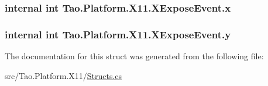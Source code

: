 \label{struct_tao_1_1_platform_1_1_x11_1_1_x_expose_event_a3272e69253de6126d1435b738e9318b5}
\hypertarget{struct_tao_1_1_platform_1_1_x11_1_1_x_expose_event_a4d2698124160d8bf10eee02399e1c3ca}{
\subsubsection[{x}]{\setlength{\rightskip}{0pt plus 5cm}internal int {\bf Tao.Platform.X11.XExposeEvent.x}}}
\label{struct_tao_1_1_platform_1_1_x11_1_1_x_expose_event_a4d2698124160d8bf10eee02399e1c3ca}
\hypertarget{struct_tao_1_1_platform_1_1_x11_1_1_x_expose_event_a47b92e32b09eca580a826f874be52e3c}{
\subsubsection[{y}]{\setlength{\rightskip}{0pt plus 5cm}internal int {\bf Tao.Platform.X11.XExposeEvent.y}}}
\label{struct_tao_1_1_platform_1_1_x11_1_1_x_expose_event_a47b92e32b09eca580a826f874be52e3c}


The documentation for this struct was generated from the following file:\begin{DoxyCompactItemize}
\item 
src/Tao.Platform.X11/\hyperlink{_structs_8cs}{Structs.cs}\end{DoxyCompactItemize}
